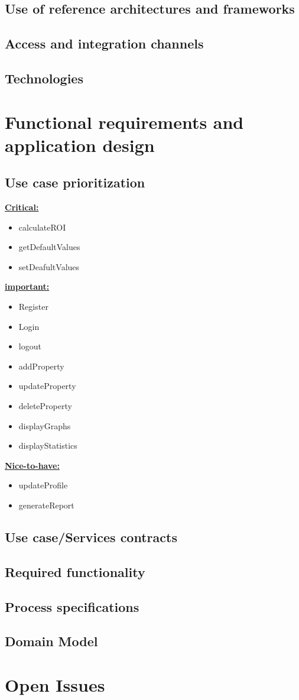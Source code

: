 \documentclass[a4paper,12pt]{article}
\begin{document}
\subsection{Use of reference architectures and frameworks}
\subsection{Access and integration channels}
\subsection{Technologies}

\newpage
\section{Functional requirements and application design}

\subsection{Use case prioritization}
 \underline{\textbf{Critical:}}
	\begin{itemize}
		\item calculateROI
		\item getDefaultValues
		\item setDeafultValues
	\end{itemize}
\underline{\textbf{important:}}
	\begin{itemize}
		\item Register
		\item Login
		\item logout
		\item addProperty
		\item updateProperty	
		\item deleteProperty
		\item displayGraphs
		\item displayStatistics	
	\end{itemize}
\underline{\textbf{Nice-to-have:}}
	\begin{itemize}
		\item updateProfile
		\item generateReport	
	\end{itemize}


\subsection{Use case/Services contracts}
\subsection{Required functionality}
\subsection{Process specifications}
\subsection{Domain Model}

\newpage
\section{Open Issues}
\end{document}
